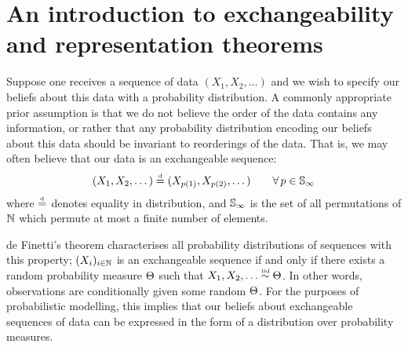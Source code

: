 
\section{An introduction to exchangeability and representation theorems}

Suppose one receives a sequence of data $(X_1, X_2, \dots)$ and we wish to specify our beliefs about this data with a probability distribution.
A commonly appropriate prior assumption is that we do not believe the order of the data contains any information, or rather that any probability distribution encoding our beliefs about this data should be invariant to reorderings of the data.
That is, we may often believe that our data is an exchangeable sequence:
\[
  \label{eq:intro:exch}
  (X_1, X_2, \dots) \stackrel{\mbox{\tiny d}}{=} (X_{p(1)}, X_{p(2)}, \dots) \qquad \forall\, p\in\mathbb{S}_{\infty}
\]
where $\stackrel{\mbox{\tiny d}}{=}$ denotes equality in distribution, and $\mathbb{S}_{\infty}$ is the set of all permutations of $\mathbb{N}$ which permute at most a finite number of elements.

de Finetti's theorem \citep[e.g.][]{Kallenberg2005-ec} characterises all probability distributions of sequences with this property;  $(X_i)_{i\in\mathbb{N}}$ is an exchangeable sequence if and only if there exists a random probability measure $\Theta$ such that $X_1,X_2,\ldots\overset{\mbox{\tiny iid}}{\sim}\Theta$.
In other words, observations are conditionally \iid given some random $\Theta$.
For the purposes of probabilistic modelling, this implies that our beliefs about exchangeable sequences of data can be expressed in the form of a distribution over probability measures.


